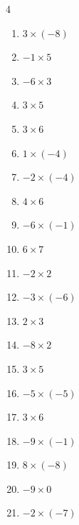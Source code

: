 \begin{multicols}{4}
\begin{enumerate}
  \item $3\times (-8)$
        \phantom{$=-24$}

  \item $-1\times 5$
        \phantom{$=-5$}

  \item $-6\times 3$
        \phantom{$=-18$}

  \item $3\times 5$
        \phantom{$=15$}

  \item $3\times 6$
        \phantom{$=18$}

  \item $1\times (-4)$
        \phantom{$=-4$}

  \item $-2\times (-4)$
        \phantom{$=8$}

  \item $4\times 6$
        \phantom{$=24$}

  \item $-6\times (-1)$
        \phantom{$=6$}

  \item $6\times 7$
        \phantom{$=42$}

  \item $-2\times 2$
        \phantom{$=-4$}

  \item $-3\times (-6)$
        \phantom{$=18$}

  \item $2\times 3$
        \phantom{$=6$}

  \item $-8\times 2$
        \phantom{$=-16$}

  \item $3\times 5$
        \phantom{$=15$}

\columnbreak %

  \item $-5\times (-5)$
        \phantom{$=25$}

  \item $3\times 6$
        \phantom{$=18$}

  \item $-9\times (-1)$
        \phantom{$=9$}

  \item $8\times (-8)$
        \phantom{$=-64$}

  \item $-9\times 0$
        \phantom{$=0$}

  \item $-2\times (-7)$
        \phantom{$=14$}


\end{enumerate}
\end{multicols}
